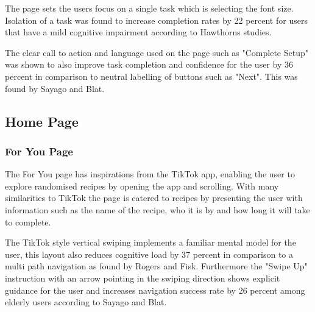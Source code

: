 \documentclass[]{project_final}
\begin{document}


The page sets the users focus on a single task which is selecting the font size. Isolation of a task was found to increase completion rates by 22 percent for users that have a mild cognitive impairment according to Hawthorns studies.

The clear call to action and language used on the page such as "Complete Setup" was shown to also improve task completion and confidence for the user by 36 percent in comparison to neutral labelling of buttons such as "Next". This was found by Sayago and Blat.

\subsection{Home Page}
\subsubsection{For You Page}
The For You page has inspirations from the TikTok app, enabling the user to explore randomised recipes by opening the app and scrolling. With many similarities to TikTok the page is catered to recipes by presenting the user with information such as the name of the recipe, who it is by and how long it will take to complete.

The TikTok style vertical swiping implements a familiar mental model for the user, this layout also reduces cognitive load by 37 percent in comparison to a multi path navigation as found by Rogers and Fisk.
Furthermore the "Swipe Up" instruction with an arrow pointing in the swiping direction shows explicit guidance for the user and increases navigation success rate by 26 percent among elderly users according to Sayago and Blat.
\end{document}
